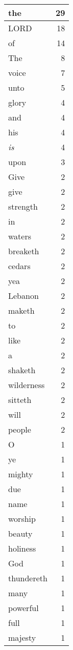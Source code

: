\begin{center}
\begin{longtable}{l|r}
\hline \hline
\endlastfoot
the & 29 \\ \hline
LORD & 18 \\ \hline
of & 14 \\ \hline
The & 8 \\ \hline
voice & 7 \\ \hline
unto & 5 \\ \hline
glory & 4 \\ \hline
and & 4 \\ \hline
his & 4 \\ \hline
\emph{is} & 4 \\ \hline
upon & 3 \\ \hline
Give & 2 \\ \hline
give & 2 \\ \hline
strength & 2 \\ \hline
in & 2 \\ \hline
waters & 2 \\ \hline
breaketh & 2 \\ \hline
cedars & 2 \\ \hline
yea & 2 \\ \hline
Lebanon & 2 \\ \hline
maketh & 2 \\ \hline
to & 2 \\ \hline
like & 2 \\ \hline
a & 2 \\ \hline
shaketh & 2 \\ \hline
wilderness & 2 \\ \hline
sitteth & 2 \\ \hline
will & 2 \\ \hline
people & 2 \\ \hline
O & 1 \\ \hline
ye & 1 \\ \hline
mighty & 1 \\ \hline
due & 1 \\ \hline
name & 1 \\ \hline
worship & 1 \\ \hline
beauty & 1 \\ \hline
holiness & 1 \\ \hline
God & 1 \\ \hline
thundereth & 1 \\ \hline
many & 1 \\ \hline
powerful & 1 \\ \hline
full & 1 \\ \hline
majesty & 1 \\ \hline

\end{longtable}
\end{center}

